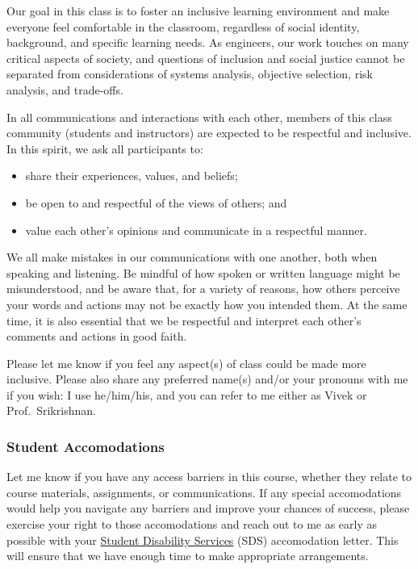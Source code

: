 \documentclass[
  letterpaper,
  DIV=11,
  numbers=noendperiod]{scrartcl}
\providecommand{\tightlist}{%
  \setlength{\itemsep}{0pt}\setlength{\parskip}{0pt}}\usepackage{longtable,booktabs,array}
\begin{document}
Our goal in this class is to foster an inclusive learning environment
and make everyone feel comfortable in the classroom, regardless of
social identity, background, and specific learning needs. As engineers,
our work touches on many critical aspects of society, and questions of
inclusion and social justice cannot be separated from considerations of
systems analysis, objective selection, risk analysis, and trade-offs.

In all communications and interactions with each other, members of this
class community (students and instructors) are expected to be respectful
and inclusive. In this spirit, we ask all participants to:

\begin{itemize}
\tightlist
\item
  share their experiences, values, and beliefs;
\item
  be open to and respectful of the views of others; and
\item
  value each other's opinions and communicate in a respectful manner.
\end{itemize}

We all make mistakes in our communications with one another, both when
speaking and listening. Be mindful of how spoken or written language
might be misunderstood, and be aware that, for a variety of reasons, how
others perceive your words and actions may not be exactly how you
intended them. At the same time, it is also essential that we be
respectful and interpret each other's comments and actions in good
faith.

Please let me know if you feel any aspect(s) of class could be made more
inclusive. Please also share any preferred name(s) and/or your pronouns
with me if you wish: I use he/him/his, and you can refer to me either as
Vivek or Prof.~Srikrishnan.

\hypertarget{student-accomodations}{%
\subsubsection{Student Accomodations}\label{student-accomodations}}

Let me know if you have any access barriers in this course, whether they
relate to course materials, assignments, or communications. If any
special accomodations would help you navigate any barriers and improve
your chances of success, please exercise your right to those
accomodations and reach out to me as early as possible with your
\href{https://sds.cornell.edu/}{Student Disability Services} (SDS)
accomodation letter. This will ensure that we have enough time to make
appropriate arrangements.
\end{document}
